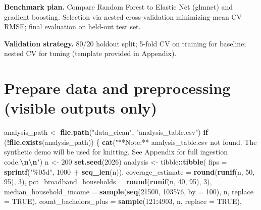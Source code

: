 \documentclass[
  11pt,
]{article}
\newenvironment{Shaded}{\begin{snugshade}}{\end{snugshade}}
\newcommand{\AttributeTok}[1]{\textcolor[rgb]{0.13,0.29,0.53}{#1}}
\newcommand{\ConstantTok}[1]{\textcolor[rgb]{0.56,0.35,0.01}{#1}}
\newcommand{\ControlFlowTok}[1]{\textcolor[rgb]{0.13,0.29,0.53}{\textbf{#1}}}
\newcommand{\DecValTok}[1]{\textcolor[rgb]{0.00,0.00,0.81}{#1}}
\newcommand{\FunctionTok}[1]{\textcolor[rgb]{0.13,0.29,0.53}{\textbf{#1}}}
\newcommand{\NormalTok}[1]{#1}
\newcommand{\OtherTok}[1]{\textcolor[rgb]{0.56,0.35,0.01}{#1}}
\newcommand{\SpecialCharTok}[1]{\textcolor[rgb]{0.81,0.36,0.00}{\textbf{#1}}}
\newcommand{\StringTok}[1]{\textcolor[rgb]{0.31,0.60,0.02}{#1}}
\begin{document}
\textbf{Benchmark plan.} Compare Random Forest to Elastic Net (glmnet)
and gradient boosting. Selection via nested cross-validation minimizing
mean CV RMSE; final evaluation on held-out test set.

\textbf{Validation strategy.} 80/20 holdout split; 5-fold CV on training
for baseline; nested CV for tuning (template provided in Appendix).

\newpage

\section{Prepare data and preprocessing (visible outputs
only)}\label{prepare-data-and-preprocessing-visible-outputs-only}

\begin{Shaded}
\begin{Highlighting}[]
\NormalTok{analysis\_path }\OtherTok{\textless{}{-}} \FunctionTok{file.path}\NormalTok{(}\StringTok{"data\_clean"}\NormalTok{, }\StringTok{"analysis\_table.csv"}\NormalTok{)}
\ControlFlowTok{if}\NormalTok{ (}\SpecialCharTok{!}\FunctionTok{file.exists}\NormalTok{(analysis\_path)) \{}
  \FunctionTok{cat}\NormalTok{(}\StringTok{"**Note:** analysis\_table.csv not found. The synthetic demo will be used for knitting. See Appendix for full ingestion code.}\SpecialCharTok{\textbackslash{}n\textbackslash{}n}\StringTok{"}\NormalTok{)}
\NormalTok{  n }\OtherTok{\textless{}{-}} \DecValTok{200}
  \FunctionTok{set.seed}\NormalTok{(}\DecValTok{2026}\NormalTok{)}
\NormalTok{  analysis }\OtherTok{\textless{}{-}}\NormalTok{ tibble}\SpecialCharTok{::}\FunctionTok{tibble}\NormalTok{(}
    \AttributeTok{fips =} \FunctionTok{sprintf}\NormalTok{(}\StringTok{"\%05d"}\NormalTok{, }\DecValTok{1000} \SpecialCharTok{+} \FunctionTok{seq\_len}\NormalTok{(n)),}
    \AttributeTok{coverage\_estimate =} \FunctionTok{round}\NormalTok{(}\FunctionTok{runif}\NormalTok{(n, }\DecValTok{50}\NormalTok{, }\DecValTok{95}\NormalTok{), }\DecValTok{3}\NormalTok{),}
    \AttributeTok{pct\_broadband\_households =} \FunctionTok{round}\NormalTok{(}\FunctionTok{runif}\NormalTok{(n, }\DecValTok{40}\NormalTok{, }\DecValTok{95}\NormalTok{), }\DecValTok{3}\NormalTok{),}
    \AttributeTok{median\_household\_income =} \FunctionTok{sample}\NormalTok{(}\FunctionTok{seq}\NormalTok{(}\DecValTok{21500}\NormalTok{, }\DecValTok{103576}\NormalTok{, }\AttributeTok{by =} \DecValTok{100}\NormalTok{), n, }\AttributeTok{replace =} \ConstantTok{TRUE}\NormalTok{),}
    \AttributeTok{count\_bachelors\_plus =} \FunctionTok{sample}\NormalTok{(}\DecValTok{121}\SpecialCharTok{:}\DecValTok{4903}\NormalTok{, n, }\AttributeTok{replace =} \ConstantTok{TRUE}\NormalTok{),}

\end{Highlighting}
\end{Shaded}
\end{document}
